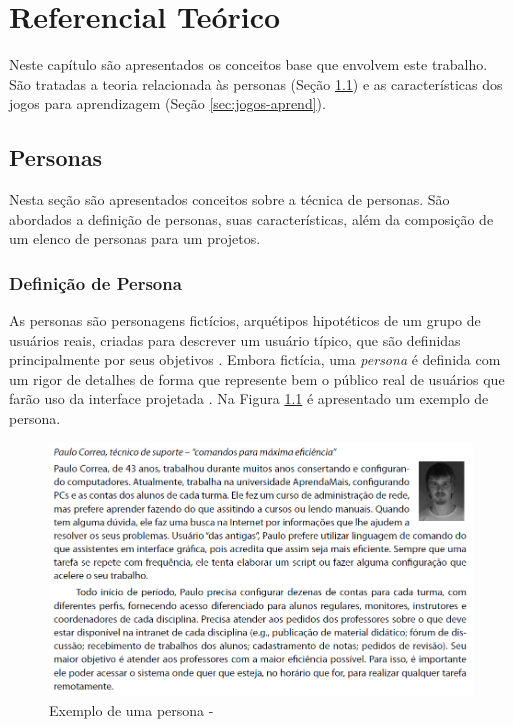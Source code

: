\chapter{Referencial Teórico}
\label{chap:ref}



Neste capítulo são apresentados os conceitos base que envolvem este trabalho. São tratadas a teoria relacionada às personas (Seção \ref{sec:personas}) e as características dos jogos para aprendizagem (Seção \ref{sec:jogos-aprend}). %


\section{Personas}
\label{sec:personas}

Nesta seção são apresentados conceitos sobre a técnica de personas. São abordados a definição de personas, suas características, além da composição de um elenco de personas para um projetos.

\subsection{Definição de Persona}

As personas são personagens fictícios, arquétipos hipotéticos de um grupo de usuários reais, criadas para descrever um usuário típico, que são definidas principalmente por seus objetivos \cite{cooper07, pruitt, cooper99}. Embora fictícia, uma \textit{persona} é definida com um rigor de detalhes de forma que represente bem o público real de usuários que farão uso da interface projetada \cite[p. 154]{BarbosaEtAl2021}. Na Figura \ref{Fig:ex-persona.png} é apresentado um exemplo de persona.

\begin{figure}[htbp]
	\centering
	\includegraphics[keepaspectratio=true,scale=0.6]{figuras/metodologia/exemplo-persona.png}
	\caption{Exemplo de uma persona - }
	\label{Fig:ex-persona.png}
\end{figure}

